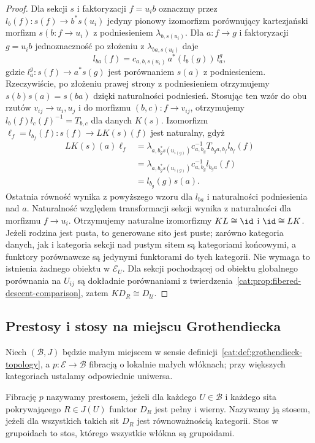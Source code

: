 \begin{proof}
Dla sekcji $s$ i faktoryzacji $f=u_i b$ oznaczmy przez $l_b(f):s(f)\to b^*s(u_i)$ jedyny pionowy izomorfizm porównujący kartezjański morfizm $s(b:f\to u_i)$ z podniesieniem $\lambda_{b,s(u_i)}$. Dla $a:f\to g$ i faktoryzacji $g=u_i b$ jednoznaczność po złożeniu z $\lambda_{ba,s(u_i)}$ daje
\[
 l_{ba}(f)=c_{a,b,s(u_i)}\,a^*(l_b(g))\,l_a^g,
\]
gdzie $l_a^g:s(f)\to a^*s(g)$ jest porównaniem $s(a)$ z podniesieniem. Rzeczywiście, po złożeniu prawej strony z podniesieniem otrzymujemy $s(b)s(a)=s(ba)$ dzięki naturalności podniesień. Stosując ten wzór do obu rzutów $v_{ij}\to u_i,u_j$ i do morfizmu $(b,c):f\to v_{ij}$, otrzymujemy $l_b(f)l_c(f)^{-1}=T_{b,c}$ dla danych $K(s)$. Izomorfizm $\ell_f=l_{b_f}(f):s(f)\to LK(s)(f)$ jest naturalny, gdyż
\[
\begin{aligned}
 LK(s)(a)\ell_f
 &=\lambda_{a,b_g^*s(u_{i(g)})}c_{a,b_g}^{-1}
       T_{b_ga,b_f}l_{b_f}(f)\\
 &=\lambda_{a,b_g^*s(u_{i(g)})}c_{a,b_g}^{-1}l_{b_ga}(f)\\
 &=l_{b_g}(g)s(a).
\end{aligned}
\]
Ostatnia równość wynika z powyższego wzoru dla $l_{ba}$ i naturalności podniesienia nad $a$. Naturalność względem transformacji sekcji wynika z naturalności dla morfizmu $f\to u_i$. Otrzymujemy naturalne izomorfizmy $KL\cong\id$ i $\id\cong LK$. Jeżeli rodzina jest pusta, to generowane sito jest puste; zarówno kategoria danych, jak i kategoria sekcji nad pustym sitem są kategoriami końcowymi, a funktory porównawcze są jedynymi funktorami do tych kategorii. Nie wymaga to istnienia żadnego obiektu w $\mathcal E_U$. Dla sekcji pochodzącej od obiektu globalnego porównania na $U_{ij}$ są dokładnie porównaniami z twierdzenia~\ref{cat:prop:fibered-descent-comparison}, zatem $K D_R\cong D_{\mathcal U}$.
\end{proof}

\subsection{Prestosy i stosy na miejscu Grothendiecka}

Niech $(\mathcal B,J)$ będzie małym miejscem w sensie definicji~\ref{cat:def:grothendieck-topology}, a $p:\mathcal E\to\mathcal B$ fibracją o lokalnie małych włóknach; przy większych kategoriach ustalamy odpowiednie uniwersa.

\begin{definicja}\label{cat:def:prestack-stack}
Fibrację $p$ nazywamy prestosem, jeżeli dla każdego $U\in\mathcal B$ i każdego sita pokrywającego $R\in J(U)$ funktor $D_R$ jest pełny i wierny. Nazywamy ją stosem, jeżeli dla wszystkich takich sit $D_R$ jest równoważnością kategorii. Stos w grupoidach to stos, którego wszystkie włókna są grupoidami.
\end{definicja}

